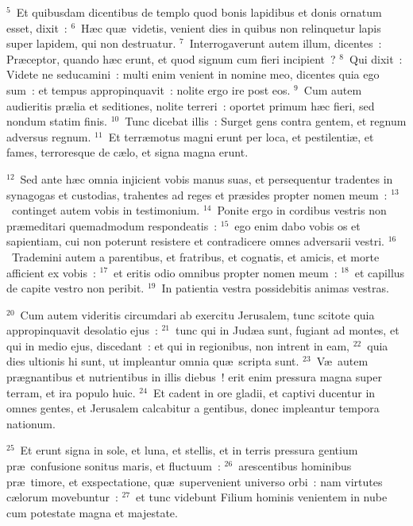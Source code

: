 ${}^{5}$~Et quibusdam dicentibus de templo quod bonis lapidibus et donis ornatum esset, dixit~:
${}^{6}$~H\ae c qu\ae\ videtis, venient dies in quibus non relinquetur lapis super lapidem, qui non destruatur.
${}^{7}$~Interrogaverunt autem illum, dicentes~: Pr\ae ceptor, quando h\ae c erunt, et quod signum cum fieri incipient~?
${}^{8}$~Qui dixit~: Videte ne seducamini~: multi enim venient in nomine meo, dicentes quia ego sum~: et tempus appropinquavit~: nolite ergo ire post eos.
${}^{9}$~Cum autem audieritis pr\ae lia et seditiones, nolite terreri~: oportet primum h\ae c fieri, sed nondum statim finis.
${}^{10}$~Tunc dicebat illis~: Surget gens contra gentem, et regnum adversus regnum.
${}^{11}$~Et terr\ae motus magni erunt per loca, et pestilenti\ae , et fames, terroresque de c\ae lo, et signa magna erunt.


${}^{12}$~Sed ante h\ae c omnia injicient vobis manus suas, et persequentur tradentes in synagogas et custodias, trahentes ad reges et pr\ae sides propter nomen meum~:
${}^{13}$~continget autem vobis in testimonium.
${}^{14}$~Ponite ergo in cordibus vestris non pr\ae meditari quemadmodum respondeatis~:
${}^{15}$~ego enim dabo vobis os et sapientiam, cui non poterunt resistere et contradicere omnes adversarii vestri.
${}^{16}$~Trademini autem a parentibus, et fratribus, et cognatis, et amicis, et morte afficient ex vobis~:
${}^{17}$~et eritis odio omnibus propter nomen meum~:
${}^{18}$~et capillus de capite vestro non peribit.
${}^{19}$~In patientia vestra possidebitis animas vestras.


${}^{20}$~Cum autem videritis circumdari ab exercitu Jerusalem, tunc scitote quia appropinquavit desolatio ejus~:
${}^{21}$~tunc qui in Jud\ae a sunt, fugiant ad montes, et qui in medio ejus, discedant~: et qui in regionibus, non intrent in eam,
${}^{22}$~quia dies ultionis hi sunt, ut impleantur omnia qu\ae\ scripta sunt.
${}^{23}$~V\ae\ autem pr\ae gnantibus et nutrientibus in illis diebus~! erit enim pressura magna super terram, et ira populo huic.
${}^{24}$~Et cadent in ore gladii, et captivi ducentur in omnes gentes, et Jerusalem calcabitur a gentibus, donec impleantur tempora nationum.


${}^{25}$~Et erunt signa in sole, et luna, et stellis, et in terris pressura gentium pr\ae\ confusione sonitus maris, et fluctuum~:
${}^{26}$~arescentibus hominibus pr\ae\ timore, et exspectatione, qu\ae\ supervenient universo orbi~: nam virtutes c\ae lorum movebuntur~:
${}^{27}$~et tunc videbunt Filium hominis venientem in nube cum potestate magna et majestate.



